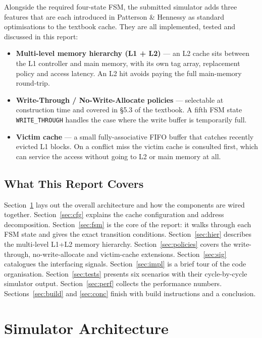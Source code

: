 \documentclass[11pt,a4paper]{article}
\begin{document}
Alongside the required four-state FSM, the submitted simulator adds three
features that are each introduced in Patterson \& Hennessy as standard
optimisations to the textbook cache. They are all implemented, tested and
discussed in this report:

\begin{itemize}[leftmargin=1.4em,itemsep=0.15em]
    \item \textbf{Multi-level memory hierarchy (L1 + L2)} — an L2 cache sits
    between the L1 controller and main memory, with its own tag array,
    replacement policy and access latency. An L2 hit avoids paying the full
    main-memory round-trip.
    \item \textbf{Write-Through / No-Write-Allocate policies} — selectable at
    construction time and covered in \S5.3 of the textbook. A fifth FSM state
    \texttt{WRITE\_THROUGH} handles the case where the write buffer is
    temporarily full.
    \item \textbf{Victim cache} — a small fully-associative FIFO buffer that
    catches recently evicted L1 blocks. On a conflict miss the victim cache is
    consulted first, which can service the access without going to L2 or main
    memory at all.
\end{itemize}

\subsection{What This Report Covers}

Section~\ref{sec:arch} lays out the overall architecture and how the
components are wired together. Section~\ref{sec:cfg} explains the cache
configuration and address decomposition. Section~\ref{sec:fsm} is the core of
the report: it walks through each FSM state and gives the exact transition
conditions. Section~\ref{sec:hier} describes the multi-level L1+L2 memory
hierarchy. Section~\ref{sec:policies} covers the write-through, no-write-allocate
and victim-cache extensions. Section~\ref{sec:sig} catalogues the interfacing
signals. Section~\ref{sec:impl} is a brief tour of the code organisation.
Section~\ref{sec:tests} presents six scenarios with their cycle-by-cycle
simulator output. Section~\ref{sec:perf} collects the performance numbers.
Sections~\ref{sec:build} and \ref{sec:conc} finish with build instructions and
a conclusion.

\section{Simulator Architecture}\label{sec:arch}
\end{document}
